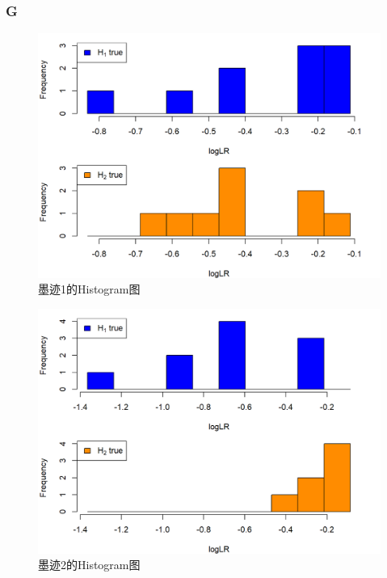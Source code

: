 \documentclass[12pt,a4paper]{article}
\begin{document}
    \subsubsection*{G}
    \begin{figure}[H]
        \centering
        \includegraphics[scale=0.8]{InkHist1.png}
        \caption*{墨迹1的Histogram图}
    \end{figure}
    \begin{figure}[H]
        \centering
        \includegraphics[scale=0.8]{InkHist2.png}
        \caption*{墨迹2的Histogram图}
    \end{figure}
\end{document}
